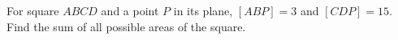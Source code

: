 For square $ABCD$ and a point $P$ in its plane, $[ABP]=3$ and $[CDP]=15$. Find the sum of all possible areas of the square.
